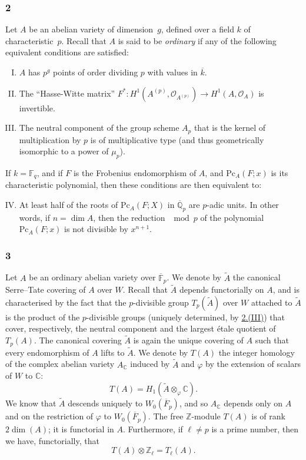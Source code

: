 \documentclass{article}
\newcommand{\sh}{\mathscr}
\newcommand{\FF}{\mathbb{F}}
\newcommand{\ZZ}{\mathbb{Z}}
\newcommand{\QQ}{\mathbb{Q}}
\newcommand{\CC}{\mathbb{C}}
\newcommand{\Pc}{\mathrm{Pc}}
\newcommand{\oldpage}[1]{\marginpar{\footnotesize$\Big\vert$ \textit{p.~#1}}}
\begin{document}
\subsubsection*{2}
\label{2}
Let $A$ be an abelian variety of dimension~$g$, defined over a field $k$ of characteristic~$p$.
Recall that $A$ is said to be \emph{ordinary} if any of the following equivalent conditions are satisfied:
\begin{enumerate}[(I)]
  \item $A$ has $p^g$ points of order dividing $p$ with values in $\overline{k}$.
  \item The ``Hasse-Witte matrix'' $F^*\colon H^1(A^{(p)},\sh{O}_{A^{(p)}}) \to H^1(A,\sh{O}_A)$ is invertible.
  \item\label{2.III}
    The neutral component of the group scheme $A_p$ that is the kernel of multiplication by $p$ is of multiplicative type (and thus geometrically isomorphic to a power of $\mu_p$).
\end{enumerate}

If $k=\FF_q$, and if $F$ is the Frobenius endomorphism of $A$, and $\Pc_A(F;x)$ is its characteristic polynomial, then these conditions are then equivalent to:
\begin{enumerate}[(I)]
\setcounter{enumi}{3}
  \item At least half of the roots of $\Pc_A(F;X)$ in $\overline{\QQ}_p$ are $p$-adic units.
    In other words, if $n=\dim A$, then the reduction $\mod p$ of the polynomial $\Pc_A(F;x)$ is not divisible by $x^{n+1}$.
\end{enumerate}


\subsubsection*{3}
\label{3}
Let $A$ be an ordinary abelian variety over $\overline{\FF}_p$.
We denote by $\widetilde{A}$ the canonical Serre--Tate covering \cite{4} of $A$ over $W$.
Recall that $\widetilde{A}$ depends functorially on $A$, and is characterised by the fact that the $p$-divisible group $T_p(\widetilde{A})$ over $W$ attached to $\widetilde{A}$ \cite{5} is the product of the
\oldpage{239}
$p$-divisible groups (uniquely determined, by \hyperref[2.III]{2.(III)}) that cover, respectively, the neutral component and the largest \'{e}tale quotient of $T_p(A)$.
The canonical covering $\widetilde{A}$ is again the unique covering of $A$ such that every endomorphism of $A$ lifts to $\widetilde{A}$.
We denote by $T(A)$ the integer homology of the complex abelian variety $A_\CC$ induced by $\widetilde{A}$ and $\varphi$ by the extension of scalars of $W$ to $\CC$:
\[
  T(A) = H_1(\widetilde{A}\otimes_\varphi\CC).
\]
We know that $\widetilde{A}$ descends uniquely to $W_0(\overline{F}_p)$, and so $A_\CC$ depends only on $A$ and on the restriction of $\varphi$ to $W_0(\overline{F}_p)$.
The free $\ZZ$-module $T(A)$ is of rank~$2\dim(A)$;
it is functorial in $A$.
Furthermore, if $\ell\neq p$ is a prime number, then we have, functorially, that
\[
\label{3.1}
  T(A)\otimes\ZZ_\ell = T_\ell(A).
\tag{3.1}
\]
\end{document}
